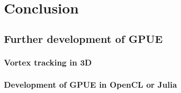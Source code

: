 \chapter*{Conclusion}

\section{Further development of GPUE}

\subsection{Vortex tracking in 3D}

\subsection{Development of GPUE in OpenCL or Julia}
